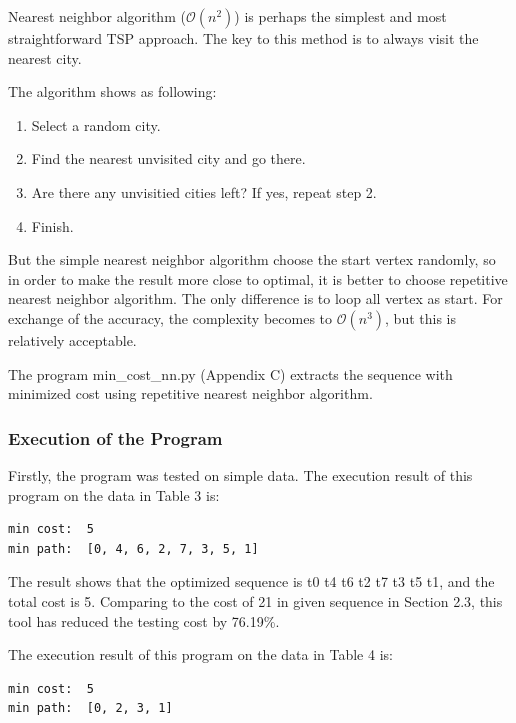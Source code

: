 \documentclass[12pt,a4paper]{article}
\begin{document}
Nearest neighbor algorithm ($\mathcal{O}(n^2)$) is perhaps the simplest and most straightforward TSP approach. The key to this method is to always visit the nearest city. 

The algorithm shows as following:\cite{1}

\begin{enumerate}
\item Select a random city.
\item Find the nearest unvisited city and go there.
\item Are there any unvisitied cities left? If yes, repeat step 2.
\item Finish.
\end{enumerate}

But the simple nearest neighbor algorithm choose the start vertex randomly, so in order to make the result more close to optimal, it is better to choose repetitive nearest neighbor algorithm. The only difference is to loop all vertex as start. For exchange of the accuracy, the complexity becomes to $\mathcal{O}(n^3)$, but this is relatively acceptable.

The program min\_cost\_nn.py (Appendix C) extracts the sequence with minimized cost using repetitive nearest neighbor algorithm. 

\subsubsection{Execution of the Program}

Firstly, the program was tested on simple data.
The execution result of this program on the data in Table 3 is:

\begin{lstlisting}
min cost:  5
min path:  [0, 4, 6, 2, 7, 3, 5, 1]
\end{lstlisting}

The result shows that the optimized sequence is t0 \textrightarrow t4 \textrightarrow t6 \textrightarrow t2 \textrightarrow t7 \textrightarrow t3 \textrightarrow t5 \textrightarrow t1, and the total cost is 5. Comparing to the cost of 21 in given sequence in Section 2.3, this tool has reduced the testing cost by 76.19\%.

The execution result of this program on the data in Table 4 is:

\begin{lstlisting}
min cost:  5
min path:  [0, 2, 3, 1]
\end{lstlisting}
\end{document}
